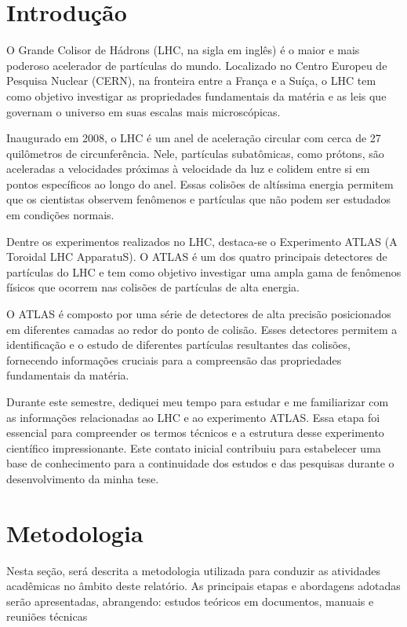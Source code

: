 \section{Introdução}\label{cap:intro}

O Grande Colisor de Hádrons (LHC, na sigla em inglês) é o maior e mais poderoso acelerador de partículas do mundo. Localizado no Centro Europeu de Pesquisa Nuclear (CERN), na fronteira entre a França e a Suíça, o LHC tem como objetivo investigar as propriedades fundamentais da matéria e as leis que governam o universo em suas escalas mais microscópicas.

Inaugurado em 2008, o LHC é um anel de aceleração circular com cerca de 27 quilômetros de circunferência. Nele, partículas subatômicas, como prótons, são aceleradas a velocidades próximas à velocidade da luz e colidem entre si em pontos específicos ao longo do anel. Essas colisões de altíssima energia permitem que os cientistas observem fenômenos e partículas que não podem ser estudados em condições normais.

Dentre os experimentos realizados no LHC, destaca-se o Experimento ATLAS (A Toroidal LHC ApparatuS). O ATLAS é um dos quatro principais detectores de partículas do LHC e tem como objetivo investigar uma ampla gama de fenômenos físicos que ocorrem nas colisões de partículas de alta energia.

O ATLAS é composto por uma série de detectores de alta precisão posicionados em diferentes camadas ao redor do ponto de colisão. Esses detectores permitem a identificação e o estudo de diferentes partículas resultantes das colisões, fornecendo informações cruciais para a compreensão das propriedades fundamentais da matéria.

Durante este semestre, dediquei meu tempo para estudar e me familiarizar com as informações relacionadas ao LHC e ao experimento ATLAS. Essa etapa foi essencial para compreender os termos técnicos e a estrutura desse experimento científico impressionante. Este contato inicial contribuiu para estabelecer uma base de conhecimento para a continuidade dos estudos e das pesquisas durante o desenvolvimento da minha tese.


\section{Metodologia}\label{cap:metodo}

Nesta seção, será descrita a metodologia utilizada para conduzir as atividades acadêmicas no âmbito deste relatório. As principais etapas e abordagens adotadas serão apresentadas, abrangendo: estudos teóricos em documentos, manuais e reuniões técnicas
 
